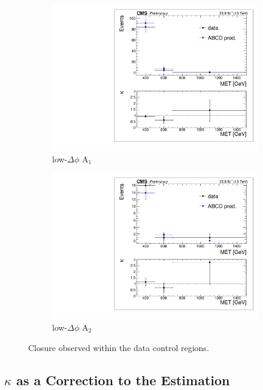 \begin{figure}[hbp!]
\begin{subfigure}[b]{0.425\textwidth}
\includegraphics[trim={5px 5px 5px 5px},clip,width=\textwidth]{figs/dataClosure_single-tagSR_lowDphi.pdf} 
\caption{low-$\Delta\phi$ A$_{1}$}
\end{subfigure}
\begin{subfigure}[b]{0.425\textwidth}
\centering
\includegraphics[trim={5px 5px 5px 5px},clip,width=\textwidth]{figs/dataClosure_double-tagSR_lowDphi.pdf} 
\caption{low-$\Delta\phi$ A$_{2}$}
\end{subfigure}
\caption{Closure observed within the data control regions.}
\label{fig:closure}
\end{figure}

\subsection{$\kappa$ as a Correction to the Estimation}
\label{sec:kappa}

